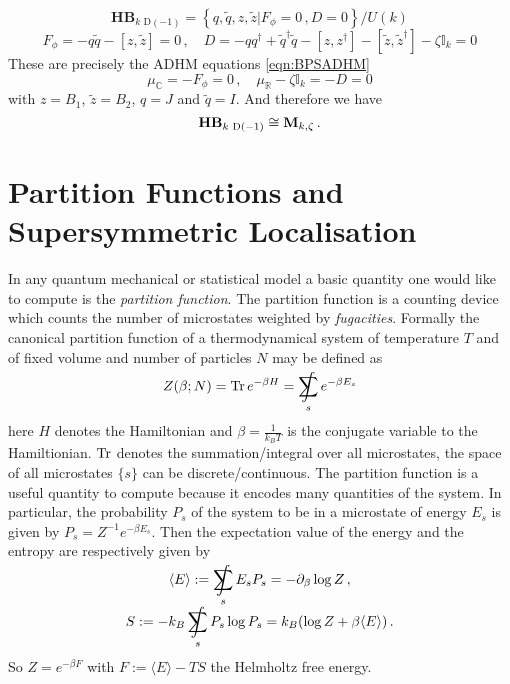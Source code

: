 \documentclass[main.tex]{subfiles}
\begin{document}
\begin{equation}
\mathbf{HB}_{\text{$k$ D$(-1)$}}=\left\{q,\widetilde{q},z,\widetilde{z}|F_{\phi}=0\,,D=0\right\}/U(k)
\end{equation}
\begin{equation}
F_{\phi}= -q\widetilde{q}-[z,\widetilde{z}]=0\,,\quad D=-qq^{\dagger}+\widetilde{q}^{\dagger}\widetilde{q}-[z,z^{\dagger}]-[\widetilde{z},\widetilde{z}^{\dagger}]-\zeta\mathbb{I}_k=0
\end{equation}
These are precisely the ADHM equations \eqref{eqn:BPSADHM}
\begin{equation}
\mu_{\mathbb{C}}=-F_{\phi}=0\,,\quad \mu_{\mathbb{R}}-\zeta\mathbb{I}_k=-D=0
\end{equation}
with $z=B_1$, $\widetilde{z}=B_2$, $q=J$ and $\widetilde{q}=I$.  And therefore we have
\begin{equation}
\mathbf{HB}_{\text{$k$ D$(-1)$}}\cong\mathbf{M}_{k,\zeta}\,.
\end{equation}  

\section{Partition Functions and Supersymmetric Localisation}\label{sec:intropartitionfns}
In any quantum mechanical or statistical model a basic quantity one would like to compute is the \textit{partition function}.  The partition function is a counting device which counts the number of microstates weighted by \textit{fugacities}.  Formally the canonical partition function of a thermodynamical system of temperature $T$ and of fixed volume and number of particles $N$ may be defined as
\begin{equation}\label{eqn:partstatistical}
Z(\beta;N)=\Tr e^{-\beta H}=\SumInt_s e^{-\beta E_s}
\end{equation}
here $H$ denotes the Hamiltonian and $\beta=\frac{1}{k_BT}$ is the conjugate variable to the Hamiltionian.  $\operatorname{Tr}$ denotes the summation/integral over all microstates, the space of all microstates $\{s\}$ can be discrete/continuous.  The partition function is a useful quantity to compute because it encodes many quantities of the system.  In particular, the probability $P_s$ of the system to be in a microstate of energy $E_s$ is given by $P_s=Z^{-1}e^{-\beta E_s}$.  Then the expectation value of the energy and the entropy are respectively given by
\begin{gather}
\langle E\rangle:=\SumInt_s E_sP_s=-\partial_{\beta} \log Z \,,\\ S:=-k_B\SumInt_s P_s\log P_s =k_B(\log Z+\beta\langle E\rangle)\,.
\end{gather} 
So $Z=e^{-\beta F}$ with $F:=\langle E\rangle-TS$ the Helmholtz free energy.
\end{document}
